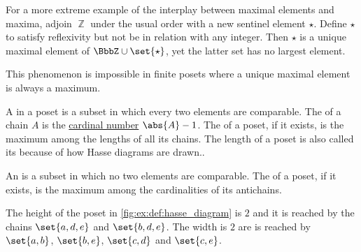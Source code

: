 \begin{example}\label{ex:unique_maximal_element_that_is_not_maximum}
  For a more extreme example of the interplay between maximal elements and maxima, adjoin \( \BbbZ \) under the usual order with a new sentinel element \( \star \). Define \( \star \) to satisfy reflexivity but not be in relation with any integer. Then \( \star \) is a unique maximal element of \( \BbbZ \cup \set{ \star } \), yet the latter set has no largest element.

  This phenomenon is impossible in finite posets where a unique maximal element is always a maximum.
\end{example}

\begin{definition}\label{def:poset_chain_and_antichain_and_antichain}
  A  in a poset is a subset in which every two elements are comparable. The  of a chain \( A \) is the \hyperref[def:cardinal]{cardinal number} \( \abs{A} - 1 \). The  of a poset, if it exists, is the maximum among the lengths of all its chains. The length of a poset is also called its  because of how Hasse diagrams are drawn..

  An  is a subset in which no two elements are comparable. The  of a poset, if it exists, is the maximum among the cardinalities of its antichains.

  The height of the poset in \cref{fig:ex:def:hasse_diagram} is \( 2 \) and it is reached by the chains \( \set{ a, d, e } \) and \( \set{ b, d, e } \). The width is \( 2 \) are is reached by \( \set{ a, b } \), \( \set{ b, e } \), \( \set{ c, d } \) and \( \set{ c, e } \).
\end{definition}

